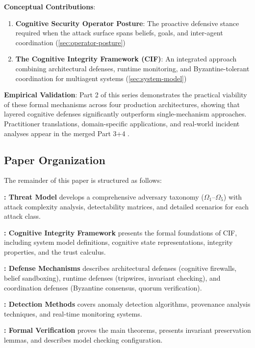 \documentclass[
]{article}
\begin{document}
\textbf{Conceptual Contributions}:

\begin{enumerate}
\item \textbf{Cognitive Security Operator Posture}: The proactive defensive stance required when the attack surface spans beliefs, goals, and inter-agent coordination (\cref{sec:operator-posture})

\item \textbf{The Cognitive Integrity Framework (CIF)}: An integrated approach combining architectural defenses, runtime monitoring, and Byzantine-tolerant coordination for multiagent systems (\cref{sec:system-model})
\end{enumerate}

\textbf{Empirical Validation}: Part 2 of this series demonstrates the
practical viability of these formal mechanisms across four production
architectures, showing that layered cognitive defenses significantly
outperform single-mechanism approaches. Practitioner translations,
domain-specific applications, and real-world incident analyses appear in
the merged Part 3+4 \cite{friedman2026cogsec3}.

\subsection{Paper Organization}\label{sec:organization}

The remainder of this paper is structured as follows:

\textbf{: Threat Model} develops a
comprehensive adversary taxonomy (\(\Omega_1\)--\(\Omega_5\)) with
attack complexity analysis, detectability matrices, and detailed
scenarios for each attack class.

\textbf{: Cognitive Integrity Framework} presents
the formal foundations of CIF, including system model definitions,
cognitive state representations, integrity properties, and the trust
calculus.

\textbf{: Defense Mechanisms} describes
architectural defenses (cognitive firewalls, belief sandboxing), runtime
defenses (tripwires, invariant checking), and coordination defenses
(Byzantine consensus, quorum verification).

\textbf{: Detection Methods} covers anomaly
detection algorithms, provenance analysis techniques, and real-time
monitoring systems.

\textbf{: Formal Verification} proves the
main theorems, presents invariant preservation lemmas, and describes
model checking configuration.
\end{document}
